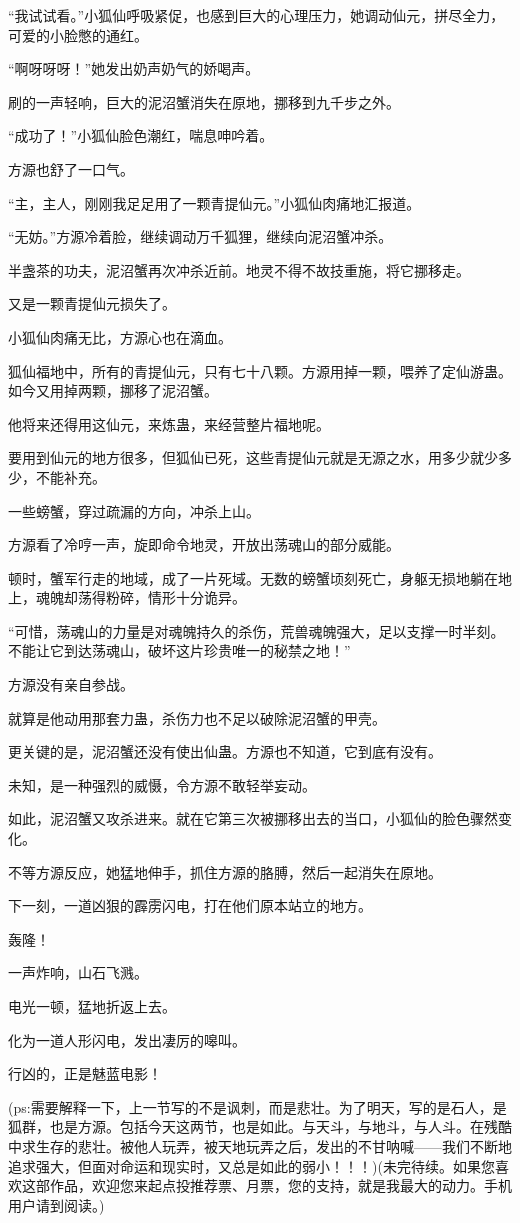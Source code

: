 \begin{this_body}
“我试试看。”小狐仙呼吸紧促，也感到巨大的心理压力，她调动仙元，拼尽全力，可爱的小脸憋的通红。

“啊呀呀呀！”她发出奶声奶气的娇喝声。

刷的一声轻响，巨大的泥沼蟹消失在原地，挪移到九千步之外。

“成功了！”小狐仙脸色潮红，喘息呻吟着。

方源也舒了一口气。

“主，主人，刚刚我足足用了一颗青提仙元。”小狐仙肉痛地汇报道。

“无妨。”方源冷着脸，继续调动万千狐狸，继续向泥沼蟹冲杀。

半盏茶的功夫，泥沼蟹再次冲杀近前。地灵不得不故技重施，将它挪移走。

又是一颗青提仙元损失了。

小狐仙肉痛无比，方源心也在滴血。

狐仙福地中，所有的青提仙元，只有七十八颗。方源用掉一颗，喂养了定仙游蛊。如今又用掉两颗，挪移了泥沼蟹。

他将来还得用这仙元，来炼蛊，来经营整片福地呢。

要用到仙元的地方很多，但狐仙已死，这些青提仙元就是无源之水，用多少就少多少，不能补充。

一些螃蟹，穿过疏漏的方向，冲杀上山。

方源看了冷哼一声，旋即命令地灵，开放出荡魂山的部分威能。

顿时，蟹军行走的地域，成了一片死域。无数的螃蟹顷刻死亡，身躯无损地躺在地上，魂魄却荡得粉碎，情形十分诡异。

“可惜，荡魂山的力量是对魂魄持久的杀伤，荒兽魂魄强大，足以支撑一时半刻。不能让它到达荡魂山，破坏这片珍贵唯一的秘禁之地！”

方源没有亲自参战。

就算是他动用那套力蛊，杀伤力也不足以破除泥沼蟹的甲壳。

更关键的是，泥沼蟹还没有使出仙蛊。方源也不知道，它到底有没有。

未知，是一种强烈的威慑，令方源不敢轻举妄动。

如此，泥沼蟹又攻杀进来。就在它第三次被挪移出去的当口，小狐仙的脸色骤然变化。

不等方源反应，她猛地伸手，抓住方源的胳膊，然后一起消失在原地。

下一刻，一道凶狠的霹雳闪电，打在他们原本站立的地方。

轰隆！

一声炸响，山石飞溅。

电光一顿，猛地折返上去。

化为一道人形闪电，发出凄厉的嗥叫。

行凶的，正是魅蓝电影！

(ps:需要解释一下，上一节写的不是讽刺，而是悲壮。为了明天，写的是石人，是狐群，也是方源。包括今天这两节，也是如此。与天斗，与地斗，与人斗。在残酷中求生存的悲壮。被他人玩弄，被天地玩弄之后，发出的不甘呐喊——我们不断地追求强大，但面对命运和现实时，又总是如此的弱小！！！)(未完待续。如果您喜欢这部作品，欢迎您来起点投推荐票、月票，您的支持，就是我最大的动力。手机用户请到阅读。)

\end{this_body}

